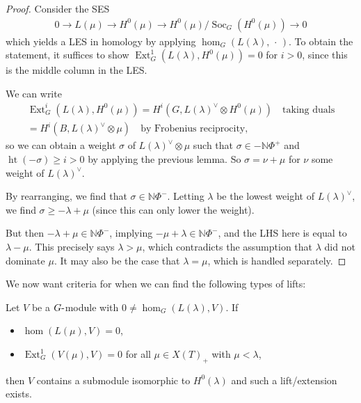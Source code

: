 \begin{proof}

Consider the SES
\begin{align*}  
0 \to L(\mu) \to H^0(\mu) \to H^0(\mu) / \operatorname{Soc}_G(H^0(\mu)) \to 0
\end{align*}
which yields a LES in homology by applying
\(\hom_G(L(\lambda), {\,\cdot\,})\). To obtain the statement, it
suffices to show \(\operatorname{Ext}_G^1(L(\lambda), H^0(\mu)) = 0\)
for \(i>0\), since this is the middle column in the LES.

We can write
\begin{align*}  
\operatorname{Ext}_G^i(L(\lambda), H^0(\mu))
=
H^i(G, L(\lambda)^\vee\otimes H^0(\mu)) \quad\text{taking duals} \\
=
H^i(B, L(\lambda)^\vee\otimes\mu) \quad\text{by Frobenius reciprocity}
,\end{align*}
so we can obtain a weight \(\sigma\) of \(L(\lambda)^\vee\otimes\mu\)
such that \(\sigma \in - {\mathbb{N}}\Phi^+\) and
\(\operatorname{ht}(-\sigma) \geq i > 0\) by applying the previous
lemma. So \(\sigma = \nu + \mu\) for \(\nu\) some weight of
\(L(\lambda)^\vee\).

By rearranging, we find that \(\sigma \in {\mathbb{N}}\Phi^-\). Letting
\(\lambda\) be the lowest weight of \(L(\lambda)^\vee\), we find
\(\sigma \geq -\lambda + \mu\) (since this can only lower the weight).

But then \(-\lambda + \mu \in {\mathbb{N}}\Phi^-\), implying
\(-\mu + \lambda \in {\mathbb{N}}\Phi^-\), and the LHS here is equal to
\(\lambda - \mu\). This precisely says \(\lambda > \mu\), which
contradicts the assumption that \(\lambda\) did not dominate \(\mu\). It
may also be the case that \(\lambda = \mu\), which is handled
separately.

\end{proof}

We now want criteria for when we can find the following types of lifts:

\begin{center}
\end{center}

\begin{lemma}[Important!]

Let \(V\) be a \(G{\hbox{-}}\)module with
\(0\neq \hom_G(L(\lambda), V)\). If

\begin{itemize}
\item
  \(\hom(L(\mu), V) = 0\),
\item
  \(\operatorname{Ext}_G^1(V(\mu), V) = 0\) for all \(\mu \in X(T)_+\)
  with \(\mu < \lambda\),
\end{itemize}

then \(V\) contains a submodule isomorphic to \(H^0(\lambda)\) and such
a lift/extension exists.

\end{lemma}

